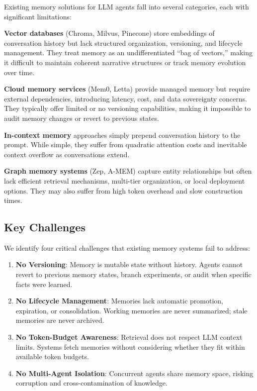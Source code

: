 Existing memory solutions for LLM agents fall into several categories, each with significant limitations:

\textbf{Vector databases} (Chroma, Milvus, Pinecone) store embeddings of conversation history but lack structured organization, versioning, and lifecycle management. They treat memory as an undifferentiated ``bag of vectors,'' making it difficult to maintain coherent narrative structures or track memory evolution over time.

\textbf{Cloud memory services} (Mem0, Letta) provide managed memory but require external dependencies, introducing latency, cost, and data sovereignty concerns. They typically offer limited or no versioning capabilities, making it impossible to audit memory changes or revert to previous states.

\textbf{In-context memory} approaches simply prepend conversation history to the prompt. While simple, they suffer from quadratic attention costs and inevitable context overflow as conversations extend.

\textbf{Graph memory systems} (Zep, A-MEM) capture entity relationships but often lack efficient retrieval mechanisms, multi-tier organization, or local deployment options. They may also suffer from high token overhead and slow construction times.

\subsection{Key Challenges}

We identify four critical challenges that existing memory systems fail to address:

\begin{enumerate}
    \item \textbf{No Versioning}: Memory is mutable state without history. Agents cannot revert to previous memory states, branch experiments, or audit when specific facts were learned.
    
    \item \textbf{No Lifecycle Management}: Memories lack automatic promotion, expiration, or consolidation. Working memories are never summarized; stale memories are never archived.
    
    \item \textbf{No Token-Budget Awareness}: Retrieval does not respect LLM context limits. Systems fetch memories without considering whether they fit within available token budgets.
    
    \item \textbf{No Multi-Agent Isolation}: Concurrent agents share memory space, risking corruption and cross-contamination of knowledge.
\end{enumerate}

